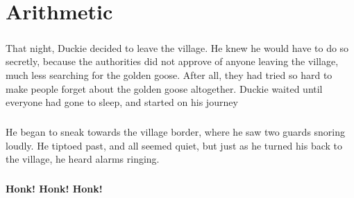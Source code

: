 \documentclass[a4paper,11pt ]{book}
\begin{document}
\chapter{Arithmetic}
\paragraph{} That night, Duckie decided to leave the village. He knew he would have to do so secretly, because the authorities did not approve of anyone leaving the village, much less searching for the golden goose. After all, they had tried so hard to make people forget about the golden goose altogether. Duckie waited until everyone had gone to sleep, and started on his journey
\paragraph{} He began to sneak towards the village border, where he saw two guards snoring loudly. He tiptoed past, and all seemed quiet, but just as he turned his back to the village, he heard alarms ringing. 
\paragraph{} \textbf{Honk! Honk! Honk!}
\end{document}
